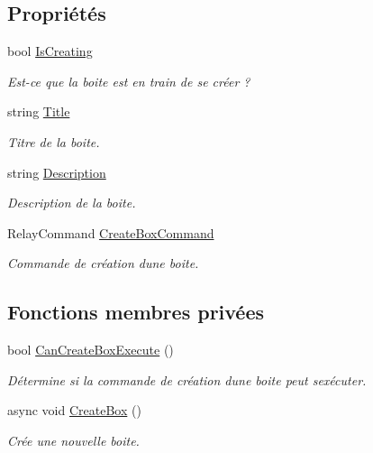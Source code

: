 \subsection*{Propriétés}
\begin{DoxyCompactItemize}
\item 
bool \hyperlink{class_boxes_1_1_view_models_1_1_create_box_view_model_a75d0cdd9fba3f1884ddb3929ae417293}{Is\+Creating}
\begin{DoxyCompactList}\small\item\em Est-\/ce que la boite est en train de se créer ? \end{DoxyCompactList}\item 
string \hyperlink{class_boxes_1_1_view_models_1_1_create_box_view_model_a65fa7ce73bfaff5493b1f01c9cb87709}{Title}
\begin{DoxyCompactList}\small\item\em Titre de la boite. \end{DoxyCompactList}\item 
string \hyperlink{class_boxes_1_1_view_models_1_1_create_box_view_model_a695ac15cd94011bd2fc5f4922a8b26ba}{Description}
\begin{DoxyCompactList}\small\item\em Description de la boite. \end{DoxyCompactList}\item 
Relay\+Command \hyperlink{class_boxes_1_1_view_models_1_1_create_box_view_model_a1caece050f657d4dd780abe99c40c57f}{Create\+Box\+Command}
\begin{DoxyCompactList}\small\item\em Commande de création d\textquotesingle{}une boite. \end{DoxyCompactList}\end{DoxyCompactItemize}
\subsection*{Fonctions membres privées}
\begin{DoxyCompactItemize}
\item 
bool \hyperlink{class_boxes_1_1_view_models_1_1_create_box_view_model_a596fd089451b84eccbd1e9d762dbd032}{Can\+Create\+Box\+Execute} ()
\begin{DoxyCompactList}\small\item\em Détermine si la commande de création d\textquotesingle{}une boite peut s\textquotesingle{}exécuter. \end{DoxyCompactList}\item 
async void \hyperlink{class_boxes_1_1_view_models_1_1_create_box_view_model_a8f78cf36a0e1f9b365d1d1d680719ada}{Create\+Box} ()
\begin{DoxyCompactList}\small\item\em Crée une nouvelle boite. \end{DoxyCompactList}\end{DoxyCompactItemize}
